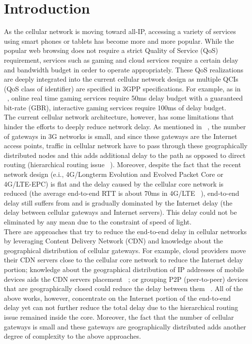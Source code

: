 \section{Introduction}

As the cellular network is moving toward all-IP, accessing a variety of services 
using smart phones or tablets has become more and more popular. 
While the popular web browsing does not require a strict Quality 
of Service (QoS) requirement, services such as gaming and cloud services 
require a certain delay and bandwidth budget in order to operate appropriately. These QoS realizations are deeply 
integrated into the current cellular network design as multiple QCIs (QoS class of identifier) are specified in 3GPP specifications. 
For example, as in ~\cite{3GPP:2012}, online real time gaming services require 50ms delay budget with 
a guaranteed bit-rate (GBR), interactive gaming services require 100ms of delay budget.\\

The current cellular network architecture, however, has some limitations that hinder the efforts to 
deeply reduce network delay. As mentioned in ~\cite{balakrishnan2009s}, the number of gateways in 
3G networks is small, and since these gateways are the Internet access points, 
traffic in cellular network have to pass through these geographically distributed nodes and 
this adds additional delay to the path as opposed to direct routing 
(hierarchical routing issue ~\cite{Dong:2011:MIU:2043468.2043472}). 
Moreover, despite the fact that the recent network design (e.i., 4G/Longterm Evolution and Evolved Packet Core or 
4G/LTE-EPC) is flat and the delay caused by the cellular 
core network is reduced (the average end-to-end RTT is about 70ms in 4G/LTE ~\cite{huang2013depth}), 
end-to-end delay still suffers from and is gradually dominated by the Internet delay (the delay between 
cellular gateways and Internet servers). This delay could not be eliminated by any mean
due to the constraint of speed of light.\\

There are approaches that try to reduce the end-to-end delay in cellular networks by 
leveraging Content Delivery Network (CDN) and knowledge about the geographical distribution of 
cellular gateways. For example, cloud providers move their CDN servers close to the cellular 
core network to reduce the Internet delay portion; knowledge about the geographical distribution 
of IP addresses of mobile devices aids the CDN servers placement ~\cite{xu2011cellular}; or 
grouping P2P (peer-to-peer) devices that are geographically closed could reduce the 
delay between them ~\cite{agarwal2009matchmaking}. All of the above works, 
however, concentrate on the Internet portion of the end-to-end delay yet 
can not further reduce the total delay due to the hierarchical routing issue remained inside the core. 
Moreover, the fact that the number of cellular gateways is small and these gateways are geographically distributed 
adds another degree of complexity to the above approaches.\\

